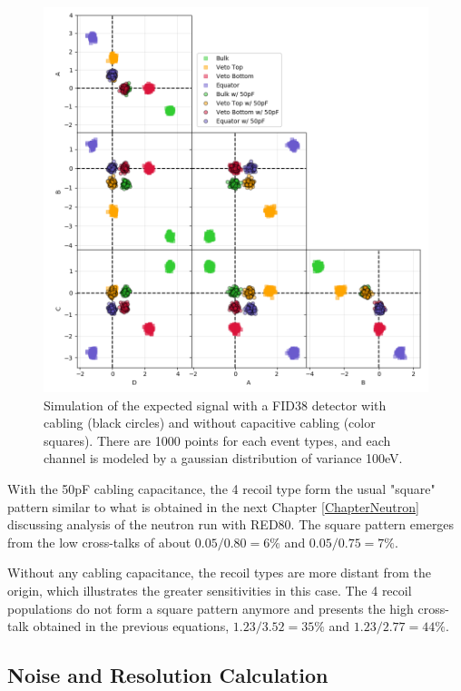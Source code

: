 \begin{figure}
\centering
\includegraphics[width=\linewidth]{Figures/Electrodes/predict_corner_plot.png}
\caption{Simulation of the expected signal with a FID38 detector with cabling (black circles) and without capacitive cabling (color squares). There are 1000 points for each event types, and each channel is modeled by a gaussian distribution of variance 100eV.}
\label{fig:predict-corner-plot}
\end{figure}

With the 50pF cabling capacitance, the 4 recoil type form the usual "square" pattern similar to what is obtained in the next Chapter \ref{ChapterNeutron} discussing analysis of the neutron run with RED80. The square pattern emerges from the low cross-talks of about $0.05/0.80=6\%$ and $0.05/0.75=7\%$.

Without any cabling capacitance, the recoil types are more distant from the origin, which illustrates the greater sensitivities in this case. The 4 recoil populations do not form a square pattern anymore and presents the high cross-talk obtained in the previous equations, $1.23/3.52=35\%$ and $1.23/2.77=44\%$.


\subsection{Noise and Resolution Calculation}
\label{par:ion-resolution-calculation}

